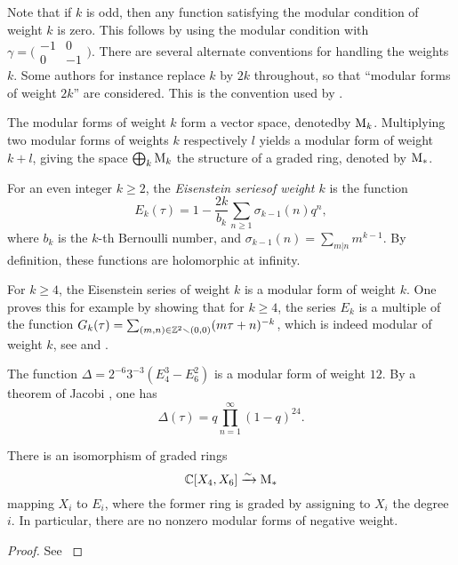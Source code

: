 Note that if $k$ is odd, then any function satisfying the modular condition of weight $k$ is zero. This follows by using the modular condition with $\gamma = 
\bigl(\begin{smallmatrix}
 -1 & 0 \\
 0 & -1
\end{smallmatrix}\bigr).$
There are several alternate conventions for handling the weights $k$. Some authors for instance replace $k$ by $2k$ throughout, so that ``modular forms of weight $2k$'' are considered. This is the convention used by \cite{Serre1973}.

The modular forms of weight $k$ form a vector space, denoted\footnotemark by $\mathrm{M}_k$. Multiplying two modular forms of weights $k$ respectively $l$ yields a modular form of weight $k+l$, giving the space $\bigoplus_k \mathrm{M}_k$ the structure of a graded ring, denoted by $\mathrm{M}_{*}$.


\begin{expls} \label{ex:delta}
 For an even integer $k\geq 2$, the \emph{Eisenstein series\footnotemark of weight $k$} is the function \[E_k(\tau)=1-\frac{2k}{b_k}\sum_{n\geq 1}\sigma_{k-1}(n)q^n,\] where $b_k$ is the $k$-th Bernoulli number, and $\sigma_{k-1}(n)=\sum_{m|n}m^{k-1}$. By definition, these functions are holomorphic at infinity.
 
 For $k\geq 4$, the Eisenstein series of weight $k$ is a modular form of weight $k$. One proves this for example by showing that for $k\geq 4$, the series $E_k$ is a multiple of the function $G_k(\tau)=\sum_{(m,n)\in\mathbb{Z}^2\smallsetminus(0,0)}(m\tau+n)^{-k}$, which is indeed modular of weight $k$, see \cite[Ch.~VII, Prop.~8]{Serre1973} and \cite[Ch.~VII, 2.3]{Serre1973}.
 
 The function $\Delta=2^{-6}3^{-3}(E_4^3-E_6^2)$ is a modular form of weight $12$. By a theorem of Jacobi \cite[Ch.~VII, Thm.~6]{Serre1973}, one has \[\Delta(\tau)=q\prod_{n=1}^{\infty}(1-q)^{24}.\]
\end{expls}


\begin{prop}
 There is an isomorphism of graded rings \[\mathbb{C}[X_4, X_6]\xrightarrow{\sim} \mathrm{M}_*\] mapping $X_i$ to $E_i$, where the former ring is graded by assigning to $X_i$ the degree $i$. In particular, there are no nonzero modular forms of negative weight.
\end{prop}
\begin{proof}
 See \cite[Ch.~VII, 3.1, 3.2]{Serre1973}
\end{proof}


